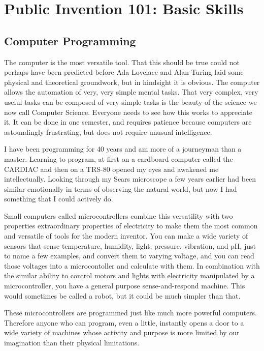\documentclass[
	fontsize=10pt, %
	twoside=false, %
	secnumdepth=1, %
]{kaobook}
\begin{document}
\chapter{Public Invention 101: Basic Skills}

\section{Computer Programming}

The computer is the most versatile tool.
That this should be true could not perhaps have been predicted
before Ada Lovelace and Alan Turing laid some physical and
theoretical groundwork,
but in hindsight it is obvious.
The computer allows the automation of very, very simple
mental tasks.
That very complex, very useful tasks can be composed of very simple tasks
is the beauty of the science we now call Computer Science.
Everyone needs to see how this works to appreciate it.
It can be done in one semester, and requires patience
because computers are astoundingly frustrating, but
does not require unusual intelligence.

I have been programming for 40 years and am more
of a journeyman than a master.
Learning to program, at first on a cardboard computer
called the CARDIAC and then on a TRS-80
opened my eyes and awakened me intellectually.
Looking through my Sears microscope a few years earlier
had been similar emotionally in terms of observing
the natural world, but now I had something that
I could actively do.

Small computers called microcontrollers combine this
versatility with two properties extraordinary properties of electricity
to make them the most common and versatile of tools for the modern inventor.
You can make a wide variety of sensors that sense
temperature, humidity, light, pressure, vibration, and pH, just
to name a few examples, and convert them to varying voltage, and
you can read those voltages into a microcontoller and calculate with them.
In combination with the similar ability to control motors and lights with
electricity manipulated by a microcontroller, you have a general
purpose sense-and-respond machine. This would sometimes be called a
robot, but it could be much simpler than that.

These microcontrollers are programmed just like much more powerful
computers. Therefore anyone who can program, even a little,
instantly opens a door to a wide variety of machines whose
activity and purpose is more limited by our imagination than their
physical limitations.
\end{document}
